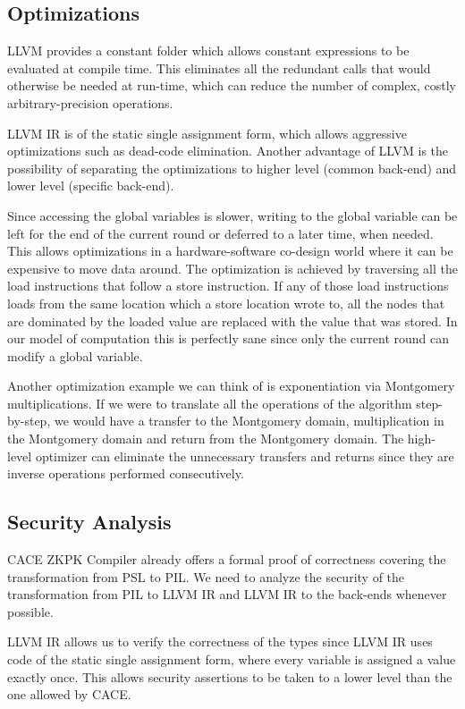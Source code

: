 
\subsection{Optimizations}

LLVM provides a constant folder which allows constant expressions to
be evaluated at compile time. This eliminates all the redundant calls
that would otherwise be needed at run-time, which can reduce the number
of complex, costly arbitrary-precision operations.

LLVM IR is of the static single assignment form, which allows
aggressive optimizations such as dead-code elimination. Another
advantage of LLVM is the possibility of separating the optimizations
to higher level (common back-end) and lower level (specific back-end).

Since accessing the global variables is slower, writing to the global
variable can be left for the end of the current round or deferred to a
later time, when needed. This allows optimizations in a
hardware-software co-design world where it can be expensive to move
data around.  The optimization is achieved by traversing all the load
instructions that follow a store instruction.  If any of those load
instructions loads from the same location which a store location wrote
to, all the nodes that are dominated by the loaded value are replaced
with the value that was stored. In our model of computation this is
perfectly sane since only the current round can modify a global
variable.

Another optimization example we can think of is exponentiation via
Montgomery multiplications. If we were to translate all the operations
of the algorithm step-by-step, we would have a transfer to the
Montgomery domain, multiplication in the Montgomery domain and return
from the Montgomery domain. The high-level optimizer can eliminate the
unnecessary transfers and returns since they are inverse operations
performed consecutively.

\subsection{Security Analysis}

CACE ZKPK Compiler already offers a formal proof of correctness
covering the transformation from PSL to PIL. We need to analyze the
security of the transformation from PIL to LLVM IR and LLVM IR to the
back-ends whenever possible.

LLVM IR allows us to verify the correctness of the types since LLVM IR
uses code of the static single assignment form, where every variable
is assigned a value exactly once. This allows security assertions to
be taken to a lower level than the one allowed by CACE. 

